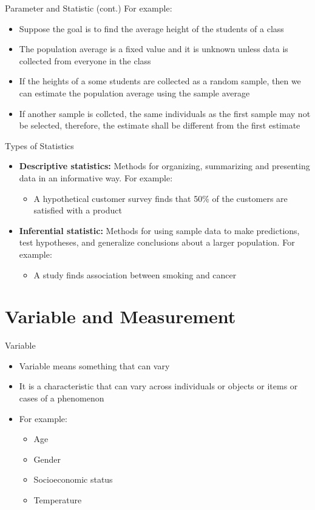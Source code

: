 \documentclass[12pt, aspectratio=169]{beamer}
\begin{document}
	\begin{frame}{Parameter and Statistic (cont.)}
		For example:
		\begin{itemize}
			\item Suppose the goal is to find the average height of the students of a class
			\item The population average is a fixed value and it is unknown unless data is collected from everyone in the class
			\item If the heights of a some students are collected as a random sample, then we can estimate the population average using the sample average
			\item If another sample is collcted, the same individuals as the first sample may not be selected, therefore, the estimate shall be different from the first estimate
		\end{itemize}
	\end{frame}


	\begin{frame}{Types of Statistics}
		\begin{itemize}
			\item \textbf{Descriptive statistics:} Methods for organizing, summarizing and presenting data in an informative way. For example:
			\begin{itemize}
				\item A hypothetical customer survey finds that 50\% of the customers are satisfied with a product
			\end{itemize}
			\item \textbf{Inferential statistic:} Methods for using sample data to make predictions, test hypotheses, and generalize conclusions about a larger population. For example:
			\begin{itemize}
				\item A study finds association between smoking and cancer
			\end{itemize}
		\end{itemize}
	\end{frame}


	\section{Variable and Measurement}


	\begin{frame}{Variable}
		\begin{itemize}
			\item Variable means something that can vary
			\item It is a characteristic that can vary across individuals or objects or items or cases of a phenomenon
			\item For example:
			\begin{itemize}
				\item Age
				\item Gender
				\item Socioeconomic status
				\item Temperature
			\end{itemize}
		\end{itemize}
	\end{frame}
\end{document}
